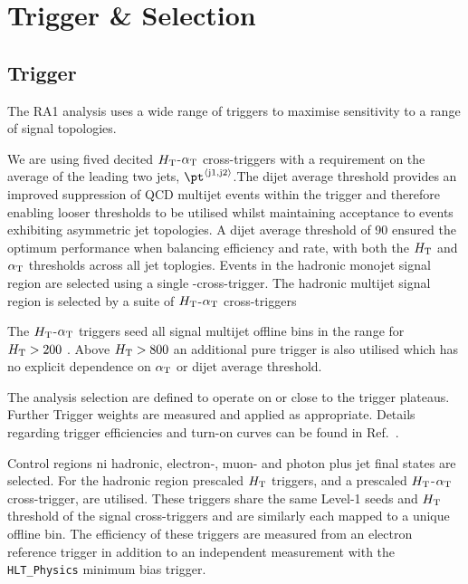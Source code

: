 \section{Trigger \& Selection}
\label{selection}

\subsection{Trigger}


The RA1 analysis uses a wide range of triggers to maximise sensitivity to a range of signal topologies. 

We are using fived decited  $\mbox{$H_\text{T}$}$-$\alpha_{\text{T}}$ cross-triggers with a requirement on the average \pt of the leading two jets, $\pt^{\rm \left<j1,j2\right>}$.The dijet average threshold provides an improved suppression of QCD multijet events within the trigger and therefore enabling looser \alphat thresholds to be utilised whilst maintaining acceptance to events exhibiting asymmetric jet topologies. A dijet average threshold of 90 \GeV ensured the optimum performance when balancing efficiency and rate, with both the $\mbox{$H_\text{T}$}$ and $\alpha_{\text{T}}$ thresholds across all jet toplogies.  Events in the hadronic monojet signal region are selected using a single \mht-\met cross-trigger. The hadronic multijet signal region is selected by a suite of $\mbox{$H_\text{T}$}$-$\alpha_{\text{T}}$ cross-triggers  

The $\mbox{$H_\text{T}$}$-$\alpha_{\text{T}}$ triggers seed all signal multijet offline bins in the range for $\mbox{$H_\text{T}$} > 200$ \GeV. Above $\mbox{$H_\text{T}$} > 800$ an additional pure \scalht trigger is also utilised which has no explicit dependence on $\alpha_{\text{T}}$ or dijet average threshold. 

The analysis selection are defined to operate on or close to the trigger plateaus. Further Trigger weights are measured and applied as appropriate. Details regarding trigger efficiencies and turn-on curves can be found in Ref.~\cite{alphaTnote}.


Control regions ni hadronic, electron-, muon- and photon plus jet final states are selected. For the hadronic region prescaled $\mbox{$H_\text{T}$}$ triggers, and a prescaled  $\mbox{$H_\text{T}$}$-$\alpha_{\text{T}}$ cross-trigger, are utilised. These triggers share the same Level-1 seeds and $\mbox{$H_\text{T}$}$ threshold of the signal cross-triggers and are similarly each mapped to a unique offline bin. The efficiency of these triggers are measured from an electron reference trigger in addition to an independent measurement with the \verb!HLT_Physics! 
minimum bias trigger.


